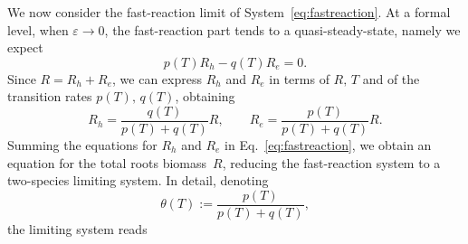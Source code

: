 \documentclass[11pt]{elsarticle}
\theoremstyle{plain}
\theoremstyle{definition}
\theoremstyle{myremark}
\begin{document}
We now consider the fast-reaction limit of System~\eqref{eq:fastreaction}. At a formal level, when $\varepsilon\to 0$, the fast-reaction part tends to a quasi-steady-state, namely we expect
$$p(T)R_h-q(T)R_e=0.$$
Since $R=R_h+R_e$, we can express $R_h$ and $R_e$ in terms of $R,\, T$ and of the transition rates $p(T),\, q(T)$, obtaining
\begin{equation}
R_h=\dfrac{q(T)}{p(T)+q(T)}R,\qquad R_e=\dfrac{p(T)}{p(T)+q(T)}R.
\end{equation}
Summing the equations for $R_h$ and $R_e$ in Eq.~\eqref{eq:fastreaction}, we obtain an equation for the total roots biomass~$R$, reducing the fast-reaction system to a two-species limiting system. In detail, denoting
\begin{equation}
  \theta(T):=\frac{p(T)}{p(T)+q(T)}, 
\end{equation}\label{eq:theta_pq}
the limiting system reads
\end{document}
